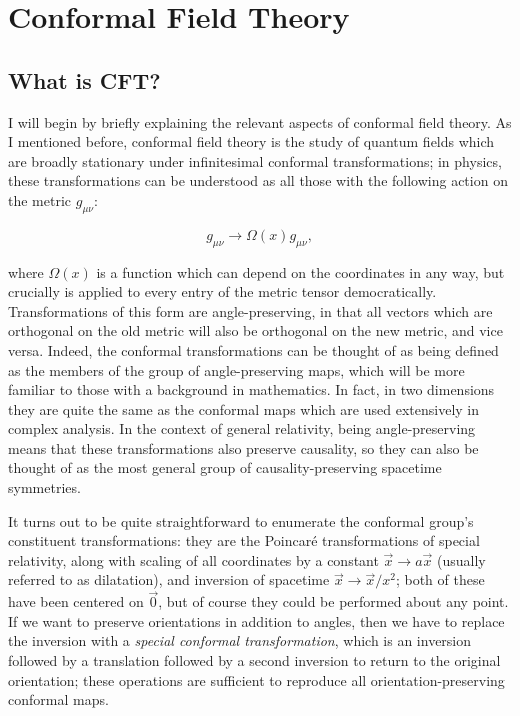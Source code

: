 \chapter{Conformal Field Theory}
\label{chap:cft}

\section{What is CFT?}
\label{sec:cft}

I will begin by briefly explaining the relevant aspects of conformal field 
theory. As I mentioned before, conformal field theory is the study of quantum
fields which are broadly stationary under infinitesimal conformal 
transformations; in physics, these transformations can be understood as all 
those with the following action on the metric $g_{\mu \nu}$\cite{Sundrum:2011ic}:

\begin{equation}
    g_{\mu \nu} \to \Omega(x) g_{\mu \nu},
\end{equation}

where $\Omega(x)$ is a function which can depend on the coordinates in any way,
but crucially is applied to every entry of the metric tensor democratically.
Transformations of this form are angle-preserving, in that all vectors which are
orthogonal on the old metric will also be orthogonal on the new metric, and vice
versa. Indeed, the conformal transformations can be thought of as being defined
as the members of the group of angle-preserving maps, which will be more 
familiar to those with a background in mathematics. In fact, in two dimensions 
they are quite the same as the conformal maps which are used extensively in 
complex analysis. In the context of general relativity, being angle-preserving 
means that these transformations also preserve causality, so they can also be
thought of as the most general group of causality-preserving spacetime 
symmetries.

It turns out to be quite straightforward to enumerate the conformal group's 
constituent transformations: they are the Poincar\'e transformations of special
relativity, along with scaling of all coordinates by a constant 
$\vec x \to a \vec x$ (usually referred to as dilatation), and inversion of 
spacetime $\vec x \to \vec x / x^2$; both of these have been centered on 
$\vec 0$, but of course they could be performed about any point. If we want to
preserve orientations in addition to angles, then we have to replace the 
inversion with a \emph{special conformal transformation}, which is an inversion
followed by a translation followed by a second inversion to return to the 
original orientation; these operations are sufficient to reproduce all 
orientation-preserving conformal maps.

